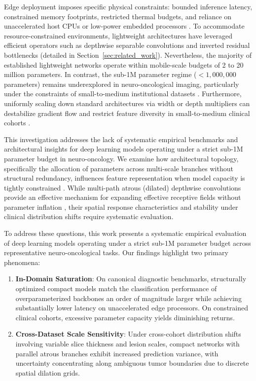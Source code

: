 \documentclass[journal]{IEEEtran}
\begin{document}
Edge deployment imposes specific physical constraints: bounded inference latency, constrained memory footprints, restricted thermal budgets, and reliance on unaccelerated host CPUs or low-power embedded processors \cite{9, 25}. To accommodate resource-constrained environments, lightweight architectures have leveraged efficient operators such as depthwise separable convolutions \cite{11, 27} and inverted residual bottlenecks \cite{22} (detailed in Section~\ref{sec:related_work}). Nevertheless, the majority of established lightweight networks operate within mobile-scale budgets of 2 to 20 million parameters. In contrast, the sub-1M parameter regime ($<1,000,000$ parameters) remains underexplored in neuro-oncological imaging, particularly under the constraints of small-to-medium institutional datasets \cite{3, 16}. Furthermore, uniformly scaling down standard architectures via width or depth multipliers can destabilize gradient flow and restrict feature diversity in small-to-medium clinical cohorts \cite{16, 19}.

This investigation addresses the lack of systematic empirical benchmarks and architectural insights for deep learning models operating under a strict sub-1M parameter budget in neuro-oncology. We examine how architectural topology, specifically the allocation of parameters across multi-scale branches without structural redundancy, influences feature representation when model capacity is tightly constrained \cite{16}. While multi-path atrous (dilated) depthwise convolutions provide an effective mechanism for expanding effective receptive fields without parameter inflation \cite{5, 16}, their spatial response characteristics and stability under clinical distribution shifts require systematic evaluation.

To address these questions, this work presents a systematic empirical evaluation of deep learning models operating under a strict sub-1M parameter budget across representative neuro-oncological tasks. Our findings highlight two primary phenomena:
\begin{enumerate}
\item \textbf{In-Domain Saturation}: On canonical diagnostic benchmarks, structurally optimized compact models match the classification performance of overparameterized backbones an order of magnitude larger while achieving substantially lower latency on unaccelerated edge processors. On constrained clinical cohorts, excessive parameter capacity yields diminishing returns.
\item \textbf{Cross-Dataset Scale Sensitivity}: Under cross-cohort distribution shifts involving variable slice thickness and lesion scales, compact networks with parallel atrous branches exhibit increased prediction variance, with uncertainty concentrating along ambiguous tumor boundaries due to discrete spatial dilation grids.
\end{enumerate}
\end{document}
